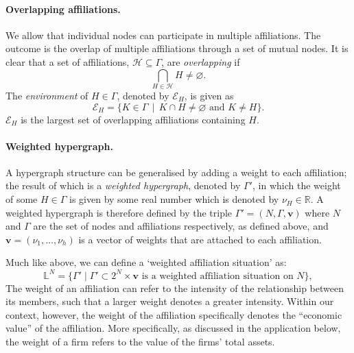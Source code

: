 \paragraph{Overlapping affiliations.}

We allow that individual nodes can participate in multiple affiliations. The outcome is the overlap of multiple affiliations through a set of mutual nodes. It is clear that a set of affiliations, $\mathcal{H} \subseteq \Gamma$, are \emph{overlapping} if
\begin{equation}
\bigcap_{H \in \mathcal{H}} H \neq \varnothing .
\end{equation}
The \emph{environment} of $H \in \Gamma$, denoted by $\mathcal{E}_{H}$, is given as
\begin{equation}
\mathcal{E}_{H} = \{K \in \Gamma \, \mid \, K \cap H \neq \varnothing \mbox{ and } K \neq H \} .
\end{equation}
$\mathcal{E}_{H}$ is the largest set of overlapping affiliations containing $H$.

\paragraph{Weighted hypergraph.}

A hypergraph structure can be generalised by adding a weight to each affiliation; the result of which is a \emph{weighted hypergraph}, denoted by $\Gamma'$, in which the weight of some $H \in \Gamma$ is given by some real number which is denoted by $\nu_{H} \in \mathbb{R}$. A weighted hypergraph is therefore defined by the triple $\Gamma' = (N, \Gamma, \mathbf{v})$ where $N$ and $\Gamma$ are the set of nodes and affiliations respectively, as defined above, and $\mathbf{v} = (\nu_{1}, \ldots , \nu_{h})$ is a vector of weights that are attached to each affiliation.

Much like above, we can define a `weighted affiliation situation' as:
\begin{equation*}
\mathbb{L}^N = \{ \Gamma' \mid \Gamma' \subset 2^N \times \mathbf{v} \mbox{ is a weighted affiliation situation on } N \} ,
\end{equation*}
The weight of an affiliation can refer to the intensity of the relationship between its members, such that a larger weight denotes a greater intensity. Within our context, however, the weight of the affiliation specifically denotes the ``economic value'' of the affiliation. More specifically, as discussed in the application below, the weight of a firm refers to the value of the firms' total assets.

